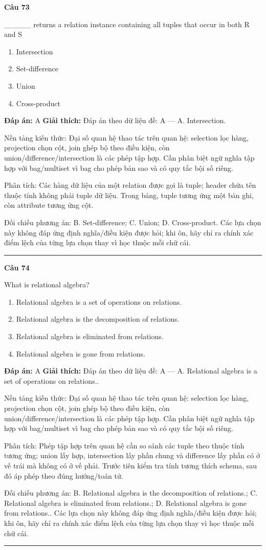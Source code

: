 \documentclass[11pt,a4paper]{article}
\newenvironment{question}[1]{%
  \par\vspace{1em}\noindent\textbf{\large Câu #1}\par\vspace{0.4em}
}{%
  \par\vspace{1em}\hrule\vspace{0.6em}
}
\newenvironment{choices}{%
  \begin{enumerate}[label=\textbf{\Alph*.},leftmargin=2.2em,itemsep=2pt,topsep=3pt]
}{%
  \end{enumerate}
}
\newcommand{\choice}{\item}
\begin{document}
\begin{question}{73}
_____ returns a relation instance containing all tuples that occur in both R and S
\begin{choices}
\choice Intersection
\choice Set-difference
\choice Union
\choice Cross-product
\end{choices}
\textbf{Đáp án:} A
\textbf{Giải thích:} Đáp án theo dữ liệu đề: A — A. Intersection.

Nền tảng kiến thức: Đại số quan hệ thao tác trên quan hệ: selection lọc hàng, projection chọn cột, join ghép bộ theo điều kiện, còn union/difference/intersection là các phép tập hợp. Cần phân biệt ngữ nghĩa tập hợp với bag/multiset vì bag cho phép bản sao và có quy tắc bội số riêng.

Phân tích: Các hàng dữ liệu của một relation được gọi là tuple; header chứa tên thuộc tính không phải tuple dữ liệu. Trong bảng, tuple tương ứng một bản ghi, còn attribute tương ứng cột.

Đối chiếu phương án: B. Set-difference; C. Union; D. Cross-product. Các lựa chọn này không đáp ứng định nghĩa/điều kiện được hỏi; khi ôn, hãy chỉ ra chính xác điểm lệch của từng lựa chọn thay vì học thuộc mỗi chữ cái.
\end{question}


\begin{question}{74}
What is relational algebra?
\begin{choices}
\choice Relational algebra is a set of operations on relations.
\choice Relational algebra is the decomposition of relations.
\choice Relational algebra is eliminated from relations.
\choice Relational algebra is gone from relations.
\end{choices}
\textbf{Đáp án:} A
\textbf{Giải thích:} Đáp án theo dữ liệu đề: A — A. Relational algebra is a set of operations on relations..

Nền tảng kiến thức: Đại số quan hệ thao tác trên quan hệ: selection lọc hàng, projection chọn cột, join ghép bộ theo điều kiện, còn union/difference/intersection là các phép tập hợp. Cần phân biệt ngữ nghĩa tập hợp với bag/multiset vì bag cho phép bản sao và có quy tắc bội số riêng.

Phân tích: Phép tập hợp trên quan hệ cần so sánh các tuple theo thuộc tính tương ứng; union lấy hợp, intersection lấy phần chung và difference lấy phần có ở vế trái mà không có ở vế phải. Trước tiên kiểm tra tính tương thích schema, sau đó áp phép theo đúng hướng/toán tử.

Đối chiếu phương án: B. Relational algebra is the decomposition of relations.; C. Relational algebra is eliminated from relations.; D. Relational algebra is gone from relations.. Các lựa chọn này không đáp ứng định nghĩa/điều kiện được hỏi; khi ôn, hãy chỉ ra chính xác điểm lệch của từng lựa chọn thay vì học thuộc mỗi chữ cái.
\end{question}
\end{document}
